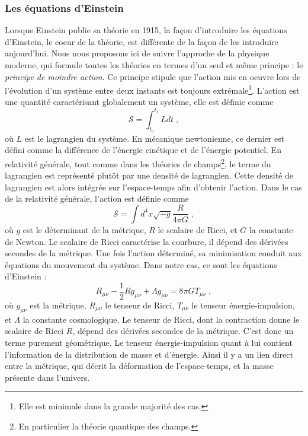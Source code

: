\subsubsection{Les équations d'Einstein}
Lorsque Einstein publie sa théorie en 1915, la façon d'introduire les équations d'Einstein, le coeur de la théorie, est différente de la façon de les introduire aujourd'hui. Nous nous proposons ici de suivre l'approche de la physique moderne, qui formule toutes les théories en termes d'un seul et même principe : le \emph{principe de moindre action}. Ce principe stipule que l'action mis en oeuvre lors de l'évolution d'un système entre deux instants est toujours extrémale\footnote{Elle est minimale dans la grande majorité des cas.}. L'action est une quantité caractérisant globalement un système, elle est définie comme
\begin{equation}
  \label{eq:action}
  \mathcal{S} = \int_{t_0}^{t_1} L dt \; ,
\end{equation}
où $L$ est le lagrangien du système. En mécanique newtonienne, ce dernier est défini comme la différence de l'énergie cinétique et de l'énergie potentiel. En relativité générale, tout comme dans les théories de champs\footnote{En particulier la théorie quantique des champs.}, le terme du lagrangien est représenté plutôt par une densité de lagrangien. Cette densité de lagrangien est alors intégrée sur l'espace-temps afin d'obtenir l'action. Dans le cas de la relativité générale, l'action est définie comme
\begin{equation}
  \label{eq:actionrg}
  \mathcal{S} = \int d^4x \sqrt{-g} \frac{R}{4 \pi G}  \; ,
\end{equation}
où $g$ est le déterminant de la métrique, $R$ le scalaire de Ricci, et $G$ la constante de Newton. Le scalaire de Ricci caractérise la courbure, il dépend des dérivées secondes de la métrique. Une fois l'action déterminé, sa minimisation conduit aux équations du mouvement du système. Dans notre cas, ce sont les équations d'Einstein :
\begin{equation}
  \label{eq:einstein}
  R_{\mu \nu} - \frac{1}{2} R g_{\mu \nu} + \Lambda g_{\mu \nu} = 8 \pi G T_{\mu \nu} \; ,
\end{equation}
où $g_{\mu \nu}$ est la métrique, $R_{\mu \nu}$ le tenseur de Ricci, $T_{\mu \nu}$ le tenseur énergie-impulsion, et $\Lambda$ la constante cosmologique. Le tenseur de Ricci, dont la contraction donne le scalaire de Ricci $R$, dépend des dérivées secondes de la métrique. C'est donc un terme purement géométrique. Le tenseur énergie-impulsion quant à lui contient l'information de la distribution de masse et d'énergie. Ainsi il y a un lien direct entre la métrique, qui décrit la déformation de l'espace-temps, et la masse présente dans l'univers.

